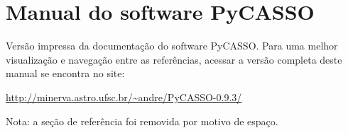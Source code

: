


\chapter{Manual do software PyCASSO}
\label{apendice:manual}

Versão impressa da documentação do software PyCASSO. Para uma melhor
visualização e navegação entre as referências, acessar a versão completa deste
manual se encontra no site:

\url{http://minerva.astro.ufsc.br/~andre/PyCASSO-0.9.3/}

Nota: a seção de referência foi removida por motivo de espaço.

\cleardoublepage



